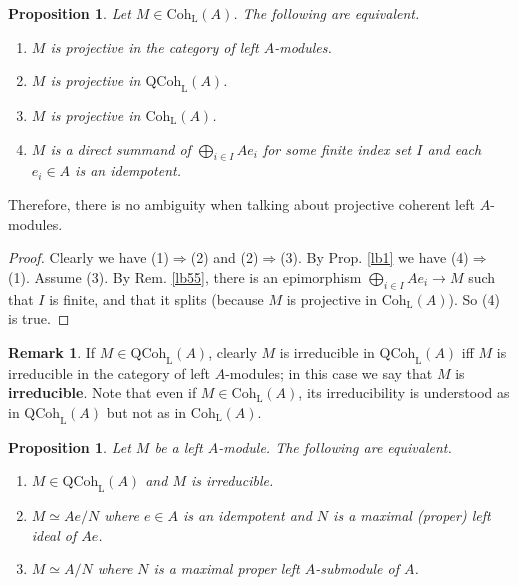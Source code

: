 \documentclass[11pt,b5paper,notitlepage]{article}
\theoremstyle{definition}
\newtheorem{rem}[df]{Remark}
\theoremstyle{plain}
\newtheorem{pp}[df]{Proposition}
\newcommand{\QC}{\mathrm{QCoh}_{\mathrm L}}
\newcommand{\Coh}{\mathrm{Coh}_{\mathrm L}}
\numberwithin{equation}{section}
\begin{document}
\begin{pp}\label{lb2}
Let $M\in\Coh(A)$. The following are equivalent.
\begin{enumerate}[label=(\arabic*)]
\item $M$ is projective in the category of left $A$-modules.
\item $M$ is projective in $\QC(A)$.
\item $M$ is projective in $\Coh(A)$.
\item $M$ is a direct summand of $\bigoplus_{i\in I}Ae_i$ for some \textit{finite} index set $I$ and each $e_i\in A$ is an idempotent.
\end{enumerate} 
\end{pp}

Therefore, there is no ambiguity when talking about projective coherent left $A$-modules.


\begin{proof}
Clearly we have (1)$\Rightarrow$(2) and (2)$\Rightarrow$(3). By Prop. \ref{lb1} we have (4)$\Rightarrow$(1). Assume (3). By Rem. \ref{lb55}, there is an epimorphism $\bigoplus_{i\in I}Ae_i\rightarrow M$ such that $I$ is finite, and that it splits (because $M$ is projective in $\Coh(A)$). So (4) is true.
\end{proof}






\begin{rem}\label{lb10}
If $M\in\QC(A)$, clearly $M$ is irreducible in $\QC(A)$ iff $M$ is irreducible in the category of left $A$-modules; in this case we say that $M$ is \textbf{irreducible}. Note that even if $M\in\Coh(A)$, its irreducibility is understood as in $\QC(A)$ but not as in $\Coh(A)$.
\end{rem}


\begin{pp}\label{lb19}
Let $M$ be a left $A$-module. The following are equivalent.
\begin{enumerate}[label=(\arabic*)]
\item $M\in\QC(A)$ and $M$ is irreducible.
\item $M\simeq Ae/N$ where $e\in A$ is an idempotent and $N$ is a maximal (proper) left ideal of $Ae$.
\item $M\simeq A/N$ where $N$ is a maximal proper left $A$-submodule of $A$.
\end{enumerate}
\end{pp}
\end{document}
